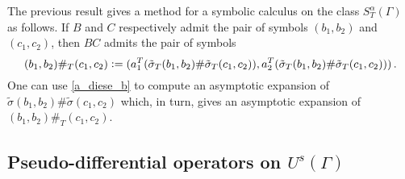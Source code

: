 \documentclass[a4paper]{article}
\begin{document}
\begin{Rem}
	\label{RemSymb}
	The previous result gives a method for a symbolic calculus on the class $S^\alpha_T(\Gamma)$ as follows. If $B$ and $C$ respectively admit the pair of symbols $(b_1,b_2)$ and $(c_1,c_2)$, then $BC$ admits the pair of symbols 
	\[(b_1,b_2) \#_T (c_1,c_2) \mathrel{\mathop:}= (a_1^T(\tilde{\sigma}_T(b_1,b_2) \# \tilde{\sigma}_T(c_1,c_2)),a_2^T(\tilde{\sigma}_T(b_1,b_2) \# \tilde{\sigma}_T(c_1,c_2)))\,.\]
	One can use \eqref{a_diese_b} to compute an asymptotic expansion of $\tilde{\sigma}(b_1,b_2) \# \tilde{\sigma}(c_1,c_2)$ which, in turn, gives an asymptotic expansion of $(b_1,b_2) \#_T (c_1,c_2)$.
\end{Rem}
\subsection{Pseudo-differential operators on $U^s(\Gamma)$}
\end{document}
